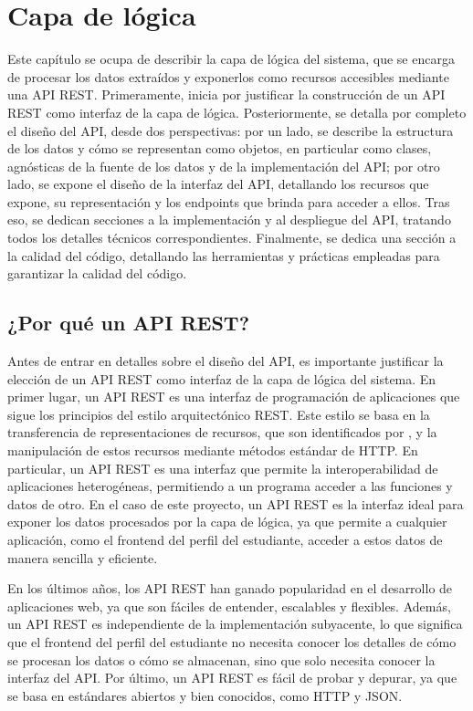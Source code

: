 \chapter{Capa de lógica}

Este capítulo se ocupa de describir la capa de lógica del sistema, que se encarga de procesar los datos extraídos y exponerlos como recursos accesibles mediante una \gls{API REST}. Primeramente, inicia por justificar la construcción de un \gls{API REST} como interfaz de la capa de lógica. Posteriormente, se detalla por completo el diseño del \gls{API}, desde dos perspectivas: por un lado, se describe la estructura de los datos y cómo se representan como objetos, en particular como clases, agnósticas de la fuente de los datos y de la implementación del \gls{API}; por otro lado, se expone el diseño de la interfaz del \gls{API}, detallando los recursos que expone, su representación y los endpoints que brinda para acceder a ellos. Tras eso, se dedican secciones a la implementación y al despliegue del \gls{API}, tratando todos los detalles técnicos correspondientes. Finalmente, se dedica una sección a la calidad del código, detallando las herramientas y prácticas empleadas para garantizar la calidad del código.

\section{¿Por qué un API REST?}

Antes de entrar en detalles sobre el diseño del \gls{API}, es importante justificar la elección de un \gls{API REST} como interfaz de la capa de lógica del sistema. En primer lugar, un \gls{API REST} es una interfaz de programación de aplicaciones que sigue los principios del estilo arquitectónico \gls{REST}. Este estilo se basa en la transferencia de representaciones de recursos, que son identificados por , y la manipulación de estos recursos mediante métodos estándar de \gls{HTTP}. En particular, un \gls{API REST} es una interfaz que permite la interoperabilidad de aplicaciones heterogéneas, permitiendo a un programa acceder a las funciones y datos de otro. En el caso de este proyecto, un \gls{API REST} es la interfaz ideal para exponer los datos procesados por la capa de lógica, ya que permite a cualquier aplicación, como el frontend del perfil del estudiante, acceder a estos datos de manera sencilla y eficiente.

En los últimos años, los \gls{API REST} han ganado popularidad en el desarrollo de aplicaciones web, ya que son fáciles de entender, escalables y flexibles. Además, un \gls{API REST} es independiente de la implementación subyacente, lo que significa que el frontend del perfil del estudiante no necesita conocer los detalles de cómo se procesan los datos o cómo se almacenan, sino que solo necesita conocer la interfaz del \gls{API}. Por último, un \gls{API REST} es fácil de probar y depurar, ya que se basa en estándares abiertos y bien conocidos, como \gls{HTTP} y \gls{JSON}.

